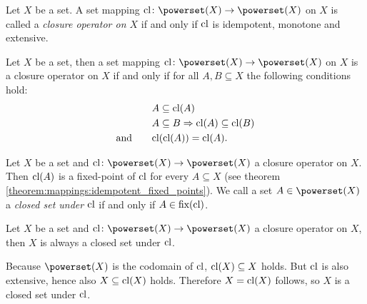 \begin{definition}
    Let $X$ be a set. A set mapping $\clop\colon\powerset(X)\rightarrow\powerset(X)$ on $X$ is called a \emph{closure operator on $X$} if and only if $\text{cl}$ is idempotent, monotone and extensive.
\end{definition}

\begin{remarks}
    \begin{remarkenumerate}
        \item Let $X$ be a set, then a set mapping $\clop\colon\powerset(X)\rightarrow\powerset(X)$ on $X$ is a closure operator on $X$ if and only if for all $A,B\subseteq X$ the following conditions hold:
        \begin{align}\begin{split}
            &A\subseteq \text{cl}(A)\\
            &A\subseteq B\Rightarrow \text{cl}(A)\subseteq \text{cl}(B)\\
            \text{and}\qquad&\text{cl}(\text{cl}(A))=\text{cl}(A).
        \end{split}\end{align}
        \item Let $X$ be a set and $\clop\colon\powerset(X)\rightarrow\powerset(X)$ a closure operator on $X$. Then $\text{cl}(A)$ is a fixed-point of $\text{cl}$ for every $A\subseteq X$ (see theorem \ref{theorem:mappings:idempotent_fixed_points}). We call a set $A\in\powerset(X)$ a \emph{closed set under $\text{cl}$} if and only if $A\in\text{fix}(\text{cl})$.
        \item Let $X$ be a set and $\clop\colon\powerset(X)\rightarrow\powerset(X)$ a closure operator on $X$, then $X$ is always a closed set under $\text{cl}$.
        \begin{miniproof}
            Because $\powerset(X)$ is the codomain of $\text{cl}$, $\text{cl}(X)\subseteq X$ holds. But $\text{cl}$ is also extensive, hence also $X\subseteq\text{cl}(X)$ holds. Therefore $X=\text{cl}(X)$ follows, so $X$ is a closed set under $\text{cl}$.
        \end{miniproof}
    \end{remarkenumerate}
\end{remarks}

